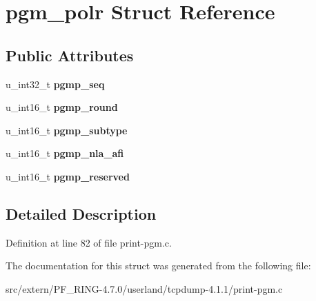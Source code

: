 \hypertarget{structpgm__polr}{
\section{pgm\_\-polr Struct Reference}
\label{structpgm__polr}
}
\subsection*{Public Attributes}
\begin{DoxyCompactItemize}
\item 
\hypertarget{structpgm__polr_afc4c42a1c82ee6962907b988d98051e2}{
u\_\-int32\_\-t {\bfseries pgmp\_\-seq}}
\label{structpgm__polr_afc4c42a1c82ee6962907b988d98051e2}

\item 
\hypertarget{structpgm__polr_a443ea6cc716ffa3a88647ab5c743298d}{
u\_\-int16\_\-t {\bfseries pgmp\_\-round}}
\label{structpgm__polr_a443ea6cc716ffa3a88647ab5c743298d}

\item 
\hypertarget{structpgm__polr_a602fdeb20232cd32966923f8670f53f6}{
u\_\-int16\_\-t {\bfseries pgmp\_\-subtype}}
\label{structpgm__polr_a602fdeb20232cd32966923f8670f53f6}

\item 
\hypertarget{structpgm__polr_ad44411f388826d950296d5380e0d27dd}{
u\_\-int16\_\-t {\bfseries pgmp\_\-nla\_\-afi}}
\label{structpgm__polr_ad44411f388826d950296d5380e0d27dd}

\item 
\hypertarget{structpgm__polr_a94c501c872b364eaafd5c77fa4f2de94}{
u\_\-int16\_\-t {\bfseries pgmp\_\-reserved}}
\label{structpgm__polr_a94c501c872b364eaafd5c77fa4f2de94}

\end{DoxyCompactItemize}


\subsection{Detailed Description}


Definition at line 82 of file print-\/pgm.c.



The documentation for this struct was generated from the following file:\begin{DoxyCompactItemize}
\item 
src/extern/PF\_\-RING-\/4.7.0/userland/tcpdump-\/4.1.1/print-\/pgm.c\end{DoxyCompactItemize}
